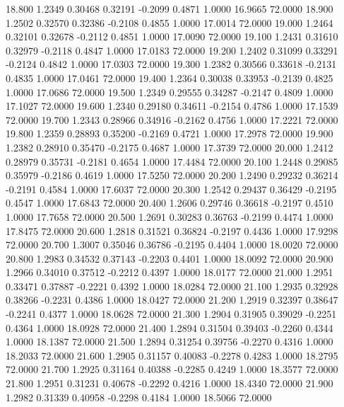  18.800   1.2349   0.30468   0.32191  -0.2099   0.4871   1.0000  16.9665  72.0000
  18.900   1.2502   0.32570   0.32386  -0.2108   0.4855   1.0000  17.0014  72.0000
  19.000   1.2464   0.32101   0.32678  -0.2112   0.4851   1.0000  17.0090  72.0000
  19.100   1.2431   0.31610   0.32979  -0.2118   0.4847   1.0000  17.0183  72.0000
  19.200   1.2402   0.31099   0.33291  -0.2124   0.4842   1.0000  17.0303  72.0000
  19.300   1.2382   0.30566   0.33618  -0.2131   0.4835   1.0000  17.0461  72.0000
  19.400   1.2364   0.30038   0.33953  -0.2139   0.4825   1.0000  17.0686  72.0000
  19.500   1.2349   0.29555   0.34287  -0.2147   0.4809   1.0000  17.1027  72.0000
  19.600   1.2340   0.29180   0.34611  -0.2154   0.4786   1.0000  17.1539  72.0000
  19.700   1.2343   0.28966   0.34916  -0.2162   0.4756   1.0000  17.2221  72.0000
  19.800   1.2359   0.28893   0.35200  -0.2169   0.4721   1.0000  17.2978  72.0000
  19.900   1.2382   0.28910   0.35470  -0.2175   0.4687   1.0000  17.3739  72.0000
  20.000   1.2412   0.28979   0.35731  -0.2181   0.4654   1.0000  17.4484  72.0000
  20.100   1.2448   0.29085   0.35979  -0.2186   0.4619   1.0000  17.5250  72.0000
  20.200   1.2490   0.29232   0.36214  -0.2191   0.4584   1.0000  17.6037  72.0000
  20.300   1.2542   0.29437   0.36429  -0.2195   0.4547   1.0000  17.6843  72.0000
  20.400   1.2606   0.29746   0.36618  -0.2197   0.4510   1.0000  17.7658  72.0000
  20.500   1.2691   0.30283   0.36763  -0.2199   0.4474   1.0000  17.8475  72.0000
  20.600   1.2818   0.31521   0.36824  -0.2197   0.4436   1.0000  17.9298  72.0000
  20.700   1.3007   0.35046   0.36786  -0.2195   0.4404   1.0000  18.0020  72.0000
  20.800   1.2983   0.34532   0.37143  -0.2203   0.4401   1.0000  18.0092  72.0000
  20.900   1.2966   0.34010   0.37512  -0.2212   0.4397   1.0000  18.0177  72.0000
  21.000   1.2951   0.33471   0.37887  -0.2221   0.4392   1.0000  18.0284  72.0000
  21.100   1.2935   0.32928   0.38266  -0.2231   0.4386   1.0000  18.0427  72.0000
  21.200   1.2919   0.32397   0.38647  -0.2241   0.4377   1.0000  18.0628  72.0000
  21.300   1.2904   0.31905   0.39029  -0.2251   0.4364   1.0000  18.0928  72.0000
  21.400   1.2894   0.31504   0.39403  -0.2260   0.4344   1.0000  18.1387  72.0000
  21.500   1.2894   0.31254   0.39756  -0.2270   0.4316   1.0000  18.2033  72.0000
  21.600   1.2905   0.31157   0.40083  -0.2278   0.4283   1.0000  18.2795  72.0000
  21.700   1.2925   0.31164   0.40388  -0.2285   0.4249   1.0000  18.3577  72.0000
  21.800   1.2951   0.31231   0.40678  -0.2292   0.4216   1.0000  18.4340  72.0000
  21.900   1.2982   0.31339   0.40958  -0.2298   0.4184   1.0000  18.5066  72.0000
